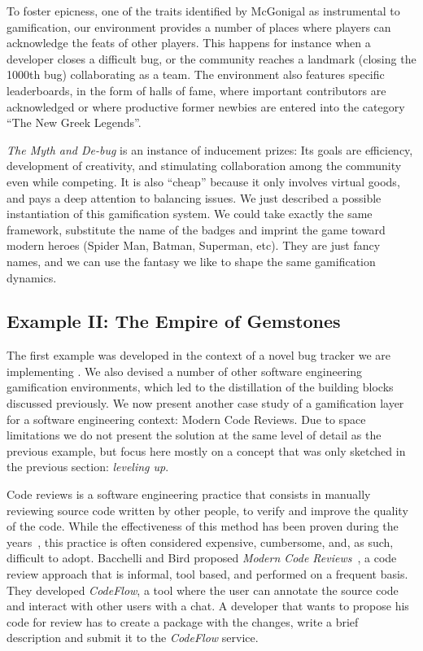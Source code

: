To foster epicness, one of the traits identified by McGonigal as instrumental to gamification, our environment provides a number of places where players can acknowledge the feats of other players. This happens for instance when a developer closes a difficult bug, or the community reaches a landmark (\eg closing the 1000th bug) collaborating as a team. The environment also features specific leaderboards, in the form of halls of fame, where important contributors are acknowledged or where productive former newbies are entered into the category ``The New Greek Legends''.

\textit{The Myth and De-bug} is an instance of inducement prizes: Its goals are efficiency, development of creativity, and stimulating collaboration among the community even while competing. It is also ``cheap'' because it only involves virtual goods, and pays a deep attention to balancing issues. We just described a possible instantiation of this gamification system. We could take exactly the same framework, substitute the name of the badges and imprint the game toward modern heroes (Spider Man, Batman, Superman, etc). They are just fancy names, and we can use the fantasy we like to shape the same gamification dynamics.

\subsection{Example II: The Empire of Gemstones}\label{sec:example-gems}

The first example was developed in the context of a novel bug tracker we are implementing \cite{DalS2014a}. We also devised a number of other software engineering gamification environments, which led to the distillation of the building blocks discussed previously. We now present another case study of a gamification layer for a software engineering context: Modern Code Reviews. Due to space limitations we do not present the solution at the same level of detail as the previous example, but focus here mostly on a concept that was only sketched in the previous section: \emph{leveling up}.

Code reviews is a software engineering practice that consists in manually reviewing source code written by other people, to verify and improve the quality of the code. While the effectiveness of this method has been proven during the years~\cite{Shull2008a}, this practice is often considered expensive, cumbersome, and, as such, difficult to adopt. Bacchelli and Bird proposed \textit{Modern Code Reviews}~\cite{Bacc2013a}, a code review approach that is informal, tool based, and performed on a frequent basis. They developed \textit{CodeFlow}, a tool where the user can annotate the source code and interact with other users with a chat. A developer that wants to propose his code for review has to create a package with the changes, write a brief description and submit it to the \textit{CodeFlow} service.

